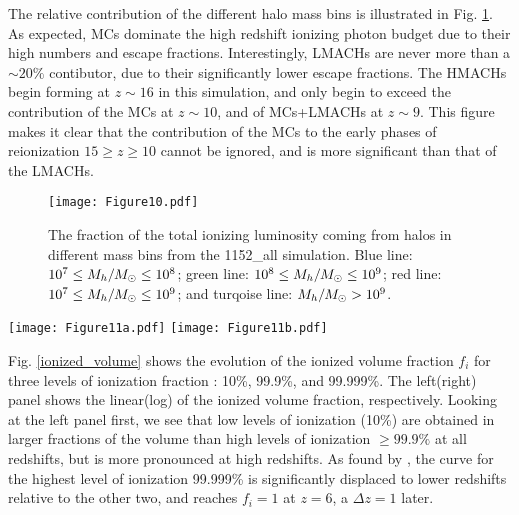 \documentclass[iop,apj]{emulateapj}
\begin{document}
The relative contribution of the different halo mass bins is illustrated in Fig. \ref{Emis_frac_4}. As expected, MCs dominate the high redshift ionizing photon budget due to their high numbers and escape fractions. Interestingly, LMACHs are never more than a $\sim 20\%$ contibutor, due to their significantly lower escape fractions. The HMACHs begin forming at $z \sim 16$ in this simulation, and only begin to exceed the contribution of the MCs at $z \sim 10$, and of MCs+LMACHs at $z \sim 9$. This figure makes it clear that the contribution of the MCs to the early phases of reionization $15 \geq z \geq 10$ cannot be ignored, and is more significant than that of the LMACHs. 



\begin{figure}
\texttt{[image: Figure10.pdf]}
\caption{The fraction of the total ionizing luminosity coming from halos in different mass bins from the 1152\_all simulation. Blue line: $10^7 \leq M_h/M_{\odot} \leq  10^8$; green line: $10^8 \leq M_h/M_{\odot}  \leq 10^9$; red line: $10^7 \leq M_h/M_{\odot}  \leq 10^9$; and turqoise line: $M_h/M_{\odot} > 10^9$. }
\label{Emis_frac_4}
\end{figure}

\begin{figure*}
\begin{center}
\centerline{
\mbox{\texttt{[image: Figure11a.pdf]}}
\mbox{\texttt{[image: Figure11b.pdf]}}}
\end{center}
\caption{Ionized volume fraction versus redshift for different ionization fraction thresholds. Top: linear scale, Bottom: logarithmic scale. Relic \hii~ regions show up prominantly in the 99.9\% curve as sources are reintroduced on 20 Myr intervals.   }
\label{ionized_volume}
\end{figure*}

Fig. \ref{ionized_volume} shows the evolution of the ionized volume fraction $f_i$ for three levels of ionization fraction \citep{So14}: 10\%, 99.9\%, and 99.999\%. The left(right) panel shows the linear(log) of the ionized volume fraction, respectively. Looking at the left panel first, we see that low levels of ionization (10\%) are obtained in larger fractions of the volume than high levels of ionization $\geq 99.9\%$ at all redshifts, but is more pronounced at high redshifts. As found by \cite{So14}, the curve for the highest level of ionization 99.999\% is significantly displaced to lower redshifts relative to the other two, and reaches $f_i = 1$ at $z=6$, a $\Delta z=1$ later.  
\end{document}
